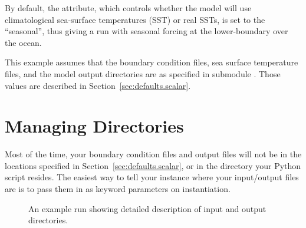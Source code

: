By default, the  attribute, which controls whether the
model will use climatological sea-surface temperatures (SST) 
or real SSTs, is set to the  ``seasonal'', thus giving a
run with seasonal forcing at the lower-boundary over the ocean.

This example assumes that the boundary condition files, sea surface
temperature files, and the model output directories are as specified
in submodule .  Those values are described in
Section~\ref{sec:defaults.scalar}.




\section{Managing Directories}

Most of the time, your boundary condition files and output files
will not be in the locations specified in
Section~\ref{sec:defaults.scalar}, or in the directory your
Python script resides.  The easiest way to tell your  
instance where your input/output files are is to pass them in
as keyword parameters on instantiation.


\begin{latexonly}
\begin{figure}[htp]
\begin{codeblock}
\end{codeblock}

\caption{An example  run showing detailed description of
	input and output directories.}
\label{fig:manage.dir.example}
\end{figure}
\end{latexonly}

